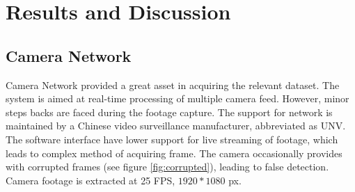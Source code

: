 \chapter{Results and Discussion}

\section{Camera Network}
Camera Network provided a great asset in acquiring the relevant dataset. The system is aimed at real-time processing of multiple camera feed. However, minor steps backs are faced during the footage capture. The support for network is maintained by a Chinese video surveillance manufacturer, abbreviated as UNV. The software interface have lower support for live streaming of footage, which leads to complex method of acquiring frame. The camera occasionally provides with corrupted frames (see figure \ref{fig:corrupted}), leading to false detection. Camera footage is extracted at 25 FPS, $1920*1080$ px.


